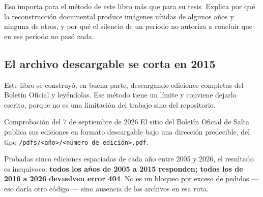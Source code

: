 Eso importa para el método de este libro más que para su tesis. Explica por qué la reconstrucción documental produce imágenes nítidas de algunos años y ninguna de otros, y por qué el silencio de un período no autoriza a concluir que en ese período no pasó nada.

\subsection*{El archivo descargable se corta en 2015}

Este libro se construyó, en buena parte, descargando ediciones completas del Boletín Oficial y leyéndolas. Ese método tiene un límite y conviene dejarlo escrito, porque no es una limitación del trabajo sino del repositorio.

\begin{ficha}{Comprobación del 7 de septiembre de 2026}
El sitio del Boletín Oficial de Salta publica sus ediciones en formato descargable bajo una dirección predecible, del tipo \texttt{/pdfs/<año>/<número de edición>.pdf}.

Probadas cinco ediciones espaciadas de cada año entre 2005 y 2026, el resultado es inequívoco: \textbf{todos los años de 2005 a 2015 responden; todos los de 2016 a 2026 devuelven error 404}. No es un bloqueo por exceso de pedidos --- eso daría otro código --- sino ausencia de los archivos en esa ruta.
\end{ficha}

